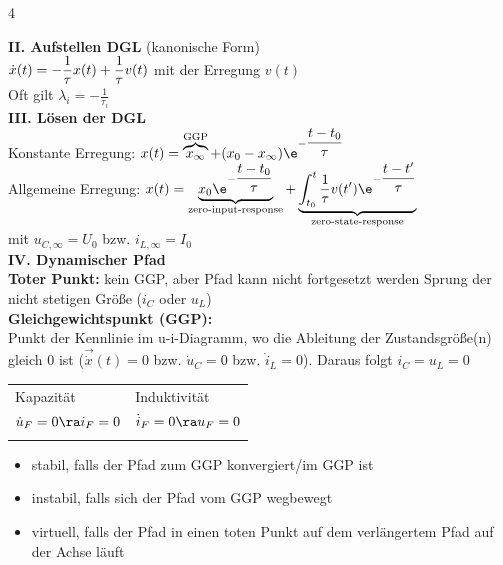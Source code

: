 \documentclass[fs, footer]{latex4ei}
\begin{document}
\begin{multicols*}{4}
{        \textbf{II. Aufstellen DGL} (kanonische Form)\\
        $\dot x(t) = - \dfrac{1}{\tau}x(t) + \dfrac{1}{\tau}v(t)$ mit der Erregung $v(t)$\\
        Oft gilt $\lambda_i=-\frac{1}{\tau_i}$ \\
        \textbf{III. Lösen der DGL}\\
        Konstante Erregung:  $x(t) = \overbrace{x_\infty}^{\text{GGP}} + (x_0 - x_\infty )\e^{-\frac{t-t_0}{\tau}}$ \\
        Allgemeine Erregung: $x(t) = \underbrace{x_0\e^{-\frac{t-t_0}{\tau}}}_{\text{zero-input-response}}+\underbrace{\int_{t_0}^t{\frac{1}{\tau}v(t')\e^{-\frac{t-t'}{\tau}}}}_{\text{zero-state-response}}$ \\
        mit $u_{C,\infty}=U_0$ bzw. $i_{L,\infty}=I_0$\\
        \textbf{IV. Dynamischer Pfad}\\
        \textbf{Toter Punkt:} kein GGP, aber Pfad kann nicht fortgesetzt werden \ra Sprung der nicht stetigen Größe ($i_C$ oder $u_L$)\\
        \textbf{Gleichgewichtspunkt (GGP):}\\
        Punkt der Kennlinie im u-i-Diagramm, wo die Ableitung der Zustandsgröße(n) gleich 0 ist ($\vec{\dot x}(t)=0$ bzw. $\dot u_C=0$ bzw. $\dot i_L=0$). Daraus folgt $i_C=u_L=0$
        \begin{tabular*}{\columnwidth}{@{\extracolsep\fill}ll@{}}
            Kapazität & Induktivität\\ \mrule
            $\dot u_F = 0 \ra i_F = 0$ & $\dot i_F = 0 \ra u_F = 0$\\
            \mrule
        \end{tabular*}
        \begin{itemize}
            \item[a)] stabil, falls der Pfad zum GGP konvergiert/im GGP ist
            \item[b)] instabil, falls sich der Pfad vom GGP wegbewegt
            \item[c)] virtuell, falls der Pfad in einen toten Punkt auf dem verlängertem Pfad auf der Achse läuft
        \end{itemize}
    }


\end{multicols*}
\end{document}
